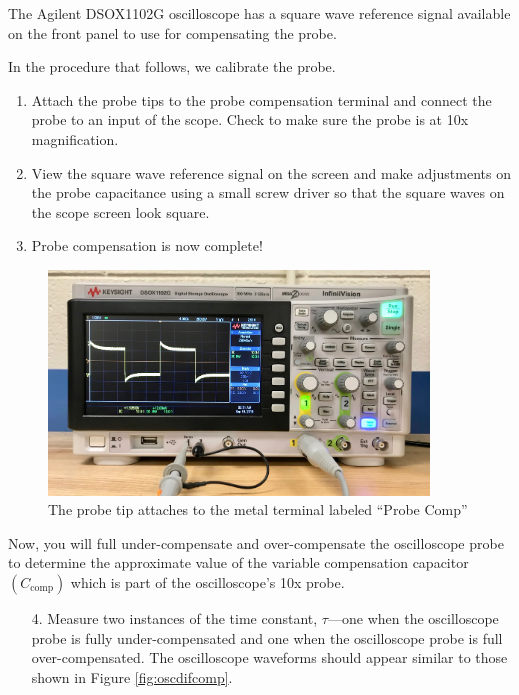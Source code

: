 \documentclass[12pt]{../manual}
\begin{document}
The Agilent DSOX1102G oscilloscope has a square wave reference signal available on the front panel to use for compensating the probe.

In the procedure that follows, we calibrate the probe.
\begin{enumerate}
\item Attach the probe tips to the probe compensation terminal and connect the probe to an input of the scope. Check to make sure the probe is at 10x magnification.
\item View the square wave reference signal on the screen and make adjustments on the probe capacitance using a small screw driver so that the square waves on the scope screen look square.
\item Probe compensation is now complete!
\end{enumerate}

\begin{figure}[ht!]
\begin{center}
\centering
\includegraphics[width=0.9\textwidth]{figures/OscProbeComp.jpeg}
\caption[Oscilloscope Probe Calibration]{The probe tip attaches to the metal terminal labeled ``Probe Comp''}
\label{fig:oscprobecomp}
\end{center}
\end{figure}

Now, you will full under-compensate and over-compensate the oscilloscope probe to determine the approximate value of the variable compensation capacitor $(C_{\mathrm{comp}})$ which is part of the oscilloscope's 10x probe.

\begin{itemize}
\item[4.] Measure two instances of the time constant, $\tau$---one when the oscilloscope probe is fully under-compensated and one when the oscilloscope probe is full over-compensated. The oscilloscope waveforms should appear similar to those shown in Figure \ref{fig:oscdifcomp}.
\end{itemize}
\end{document}
